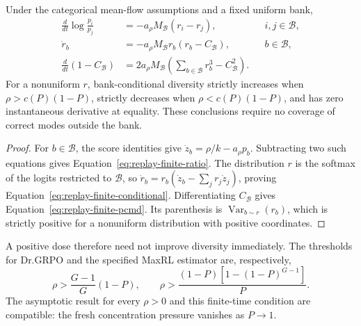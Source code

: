 \begin{theorem}
\enforcehalffinalproseline
\label{thm:replay-finite-threshold}
Under the categorical mean-flow assumptions and a fixed uniform bank,
\begin{align}
 \frac{d}{dt}\log\frac{p_i}{p_j}
  &=-a_\rho M_{\mathcal B}(r_i-r_j),
   &&i,j\in\mathcal B,\label{eq:replay-finite-ratio}\\
 \dot r_b&=-a_\rho M_{\mathcal B}r_b(r_b-C_{\mathcal B}),
   &&b\in\mathcal B,\label{eq:replay-finite-conditional}\\
 \frac{d}{dt}(1-C_{\mathcal B})
  &=2a_\rho M_{\mathcal B}
    \left(\sum_{b\in\mathcal B}r_b^3-C_{\mathcal B}^2\right).
 \label{eq:replay-finite-pcmd}
\end{align}
For a nonuniform $r$, bank-conditional diversity strictly increases when
$\rho>c(P)(1-P)$, strictly decreases when $\rho<c(P)(1-P)$, and has zero
instantaneous derivative at equality. These conclusions require no coverage
of correct modes outside the bank.
\end{theorem}

\begin{proof}
\enforcehalffinalproseline
For $b\in\mathcal B$, the score identities give
$\dot z_b=\rho/k-a_\rho p_b$. Subtracting two such equations gives
Equation~\eqref{eq:replay-finite-ratio}. The distribution $r$ is the softmax
of the logits restricted to $\mathcal B$, so
$\dot r_b=r_b(\dot z_b-\sum_jr_j\dot z_j)$, proving
Equation~\eqref{eq:replay-finite-conditional}. Differentiating
$C_{\mathcal B}$ gives Equation~\eqref{eq:replay-finite-pcmd}.
Its parenthesis is $\operatorname{Var}_{b\sim r}(r_b)$, which is strictly
positive for a nonuniform distribution with positive coordinates.
\end{proof}

A positive dose therefore need not improve diversity immediately.
The thresholds for Dr.GRPO and the specified MaxRL estimator are, respectively,
\[
 \rho>\frac{G-1}{G}(1-P),\qquad
 \rho>\frac{(1-P)[1-(1-P)^{G-1}]}{P}.
\]
The asymptotic result for every $\rho>0$ and this finite-time condition are
compatible: the fresh concentration pressure vanishes as $P\to1$.

